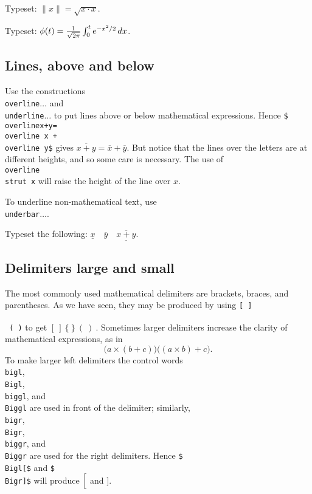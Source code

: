 \exercise Typeset: $\|x\| = \sqrt{x\cdot x}$. 
 
\exercise Typeset: 
$\phi(t) = {1 \over \sqrt{2\pi}} \int_0^t e^{-x^2/2}\,dx$. 
 
 
\subsection{Lines, above and below} 
 
Use the constructions {\tt \\overline\lb$\ldots$\rb} and 
{\tt \\underline\lb$\ldots$\rb} to put lines above or below mathematical 
expressions. Hence {\tt \$\\overline\lb x+y\rb=\\overline x + \\overline 
y\$} gives $\overline{x+y}=\overline x + \overline y$\null. 
But notice that the lines over the letters are at 
different heights, and so some care is necessary. The use of {\tt 
\\overline\lb\\strut x\rb} will raise the height of the line 
over $x$\null. 
 
To underline non-mathematical text, use {\tt \\underbar\lb$\dots$\rb}. 
 
\exercise Typeset the following: $\underline x \quad \overline y 
\quad \underline{\overline{x+y}}$. 
 
 
\subsection{Delimiters large and small} 
 
The most commonly used mathematical delimiters are brackets, 
braces, and parentheses.  As we have seen, they may be produced 
by using {\tt [ ] \\\lb\ \\\rb\ ( )} to get 
$[\>]\>\{\>\}\>(\>)\>$. Sometimes larger delimiters increase the 
clarity of mathematical expressions, as in 
$$\bigl(a\times(b+c)\bigr) \bigl((a\times b)+c\bigr).$$ To make 
larger left delimiters the control words {\tt \\bigl}, {\tt 
\\Bigl}, {\tt \\biggl}, and {\tt \\Biggl} are used in front of 
the delimiter; similarly, {\tt \\bigr}, {\tt \\Bigr}, {\tt 
\\biggr}, and {\tt \\Biggr} are used for the 
right delimiters. Hence {\tt \$\\Bigl[\$} and {\tt \$\\Bigr]\$} 
will produce $\Bigl[$ and $\Bigr]$. 
 
